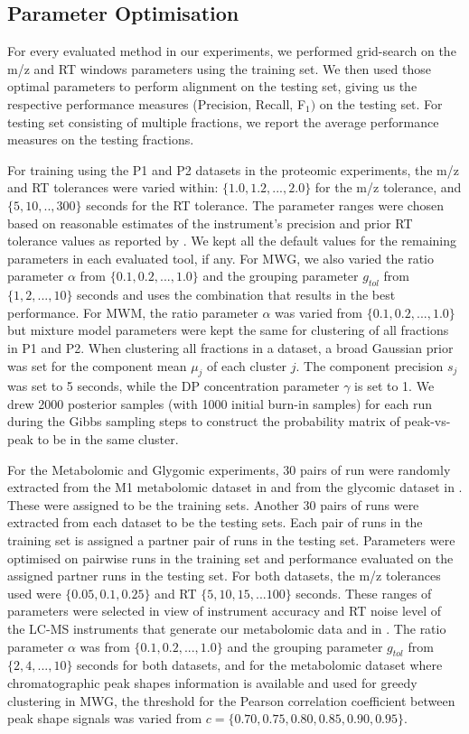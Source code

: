 \subsection{Parameter Optimisation\label{sub:parameters-optimisation}}

For every evaluated method in our experiments, we performed grid-search on the m/z and RT windows parameters using the training set. We then used those optimal parameters to perform alignment on the testing set, giving us the respective performance measures (Precision, Recall, F$_{1})$ on the testing set. For testing set consisting of multiple fractions, we report the average performance measures on the testing fractions.

For training using the P1 and P2 datasets in the proteomic experiments, the m/z and RT tolerances were varied within: $\{1.0,1.2,...,2.0\}$ for the m/z tolerance, and $\{5,10,..,300\}$ seconds for the RT tolerance. The parameter ranges were chosen based on reasonable estimates of the instrument's precision and prior RT tolerance values as reported by \cite{Lange2008}. We kept all the default values for the remaining parameters in each evaluated tool, if any. For MWG, we also varied the ratio parameter $\alpha$ from $\{0.1,0.2,...,1.0\}$ and the grouping parameter $g_{tol}$ from $\{1,2,...,10\}$ seconds and uses the combination that results in the best performance. For MWM, the ratio parameter $\alpha$ was varied from $\{0.1,0.2,...,1.0\}$ but mixture model parameters were kept the same for clustering of all fractions in P1 and P2. When clustering all fractions in a dataset, a broad Gaussian prior was set for the component mean $\mu_{j}$ of each cluster $j$. The component precision $s_{j}$ was set to 5 seconds, while the DP concentration parameter $\gamma$ is set to 1. We drew 2000 posterior samples (with 1000 initial burn-in samples) for each run during the Gibbs sampling steps to construct the probability matrix of peak-vs-peak to be in the same cluster.

For the Metabolomic and Glygomic experiments, 30 pairs of run were randomly extracted from the M1 metabolomic dataset in \cite{Lange2008} and from the glycomic dataset in \cite{Tsai2013a}. These were assigned to be the training sets. Another 30 pairs of runs were extracted from each dataset to be the testing sets. Each pair of runs in the training set is assigned a partner pair of runs in the testing set. Parameters were optimised on pairwise runs in the training set and performance evaluated on the assigned partner runs in the testing set. For both datasets, the m/z tolerances used were $\{0.05,0.1,0.25\}$ and RT $\{5,10,15,...100\}$ seconds. These ranges of parameters were selected in view of instrument accuracy and RT noise level of the LC-MS instruments that generate our metabolomic data and in \cite{Tsai2013a}. The ratio parameter $\alpha$ was from $\{0.1,0.2,...,1.0\}$ and the grouping parameter $g_{tol}$ from $\{2,4,...,10\}$ seconds for both datasets, and for the metabolomic dataset where chromatographic peak shapes information is available and used for greedy clustering in MWG, the threshold for the Pearson correlation coefficient between peak shape signals was varied from $c=\{0.70,0.75,0.80,0.85,0.90,0.95\}$. 

